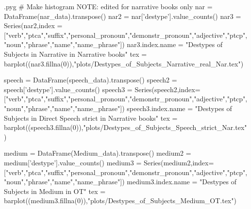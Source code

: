\documentclass{report}
\makeatletter
\newenvironment{python}{%
  \VerbatimEnvironment
  \minted@resetoptions
  \setkeys{minted@opt}{}
      \begin{VerbatimOut}{\jobname.pyg}}
{%
      \end{VerbatimOut}
      \minted@pygmentize{python}
      \DeleteFile{\jobname.pyg}}
\makeatother
\begin{document}
\begin{python}
# Make histogram NOTE: edited for narrative books only
nar = DataFrame(nar_data).transpose()
nar2 = nar['destype'].value_counts()
nar3 = Series(nar2,index = ["verb","ptca","suffix","personal_pronoun","demonstr_pronoun","adjective","ptcp","noun","phrase","name","name_phrase"])
nar3.index.name = "Destypes of Subjects in Narrative in Narrative books"
tex = barplot((nar3.fillna(0)),"plots/Destypes_of_Subjects_Narrative_real_Nar.tex")

speech = DataFrame(speech_data).transpose()
speech2 = speech['destype'].value_counts()
speech3 = Series(speech2,index=["verb","ptca","suffix","personal_pronoun","demonstr_pronoun","adjective","ptcp","noun","phrase","name","name_phrase"])
speech3.index.name = "Destypes of Subjects in Direct Speech strict in Narrative books"
tex = barplot((speech3.fillna(0)),"plots/Destypes_of_Subjects_Speech_strict_Nar.tex")

medium = DataFrame(Medium_data).transpose()
medium2 = medium['destype'].value_counts()
medium3 = Series(medium2,index=["verb","ptca","suffix","personal_pronoun","demonstr_pronoun","adjective","ptcp","noun","phrase","name","name_phrase"])
medium3.index.name = "Destypes of Subjects in Medium in OT"
tex = barplot((medium3.fillna(0)),"plots/Destypes_of_Subjects_Medium_OT.tex")
\end{python}
\end{document}
